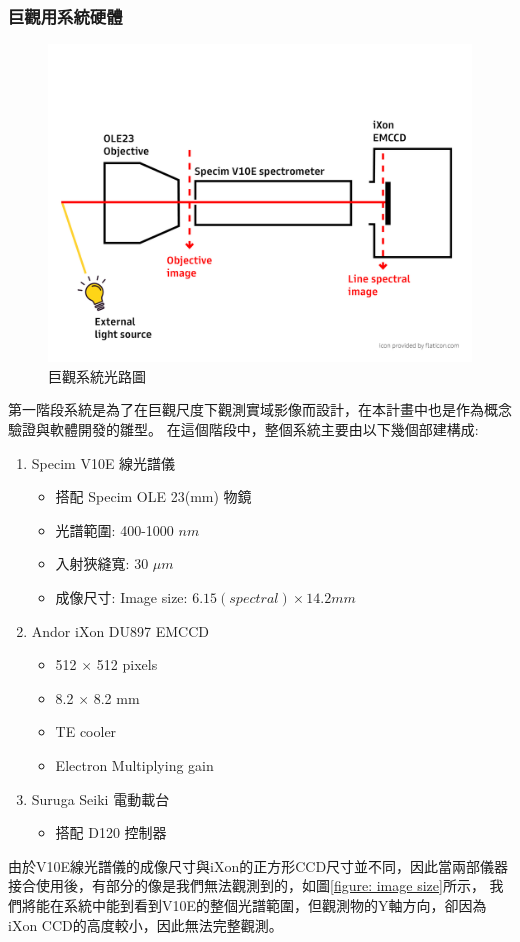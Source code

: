 \documentclass[12pt]{article}
\begin{document}
\subsubsection{巨觀用系統硬體}
\begin{figure}
    \centering
    \includegraphics[width = 0.9\linewidth]{lightPath.jpg}
    \caption{巨觀系統光路圖}
\end{figure}
第一階段系統是為了在巨觀尺度下觀測實域影像而設計，在本計畫中也是作為概念驗證與軟體開發的雛型。
在這個階段中，整個系統主要由以下幾個部建構成:
\begin{enumerate}
    \item Specim V10E 線光譜儀
          \begin{itemize}
              \item 搭配 Specim OLE 23(mm) 物鏡
              \item 光譜範圍: 400-1000 $nm$
              \item 入射狹縫寬: 30 $\mu m$
              \item 成像尺寸: Image size: $6.15(spectral) \times 14.2 mm$
          \end{itemize}
    \item Andor iXon DU897 EMCCD
          \begin{itemize}
              \item 512 $\times$ 512 pixels
              \item 8.2 $\times$ 8.2 mm
              \item TE cooler
              \item Electron Multiplying gain
          \end{itemize}
    \item Suruga Seiki 電動載台
          \begin{itemize}
              \item 搭配 D120 控制器
          \end{itemize}
\end{enumerate}
由於V10E線光譜儀的成像尺寸與iXon的正方形CCD尺寸並不同，因此當兩部儀器接合使用後，有部分的像是我們無法觀測到的，如圖\ref{figure: image size}所示，
我們將能在系統中能到看到V10E的整個光譜範圍，但觀測物的Y軸方向，卻因為iXon CCD的高度較小，因此無法完整觀測。
\end{document}
